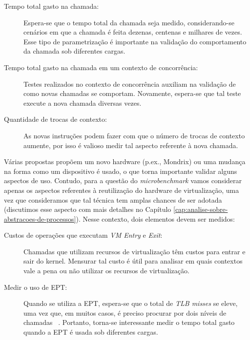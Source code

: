 \begin{description}
  \item [Tempo total gasto na chamada:]

Espera-se que o tempo total da chamada seja medido, considerando-se cenários em
que a chamada é feita dezenas, centenas e milhares de vezes. Esse tipo de
parametrização é importante na validação do comportamento da chamada sob
diferentes cargas.

  \item [Tempo total gasto na chamada em um contexto de concorrência:]

Testes realizados no contexto de concorrência auxiliam na validação de como
novas chamadas se comportam. Novamente, espera-se que tal teste execute
a nova chamada diversas vezes.

  \item [Quantidade de trocas de contexto:]

As novas instruções podem fazer com que o número de trocas de contexto aumente,
por isso é valioso medir tal aspecto referente à nova chamada.

\end{description}

Várias propostas propõem um novo hardware (p.ex., Mondrix) ou uma mudança na
forma como um dispositivo é usado, o que torna importante validar alguns
aspectos de uso. Contudo, para a questão do \emph{microbenchmark} vamos
considerar apenas os aspectos referentes à reutilização do hardware de
virtualização, uma vez que consideramos que tal técnica tem amplas chances de
ser adotada (discutimos esse aspecto com mais detalhes no Capítulo
\ref{cap:analise-sobre-abstracoes-de-processos}). Nesse contexto, dois
elementos devem ser medidos:

\begin{description}

  \item [Custos de operações que executam \emph{VM Entry} e \emph{Exit}:]

Chamadas que utilizam recursos de virtualização têm custos para entrar e sair
do kernel. Mensurar tal custo é útil para analisar em quais contextos vale a pena
ou não utilizar os recursos de virtualização.

  \item [Medir o uso de EPT:]

Quando se utiliza a EPT, espera-se que o total de \emph{TLB misses} se eleve,
uma vez que, em muitos casos, é preciso procurar por dois níveis de chamadas
~\citep{belay}. Portanto, torna-se interessante medir o tempo total gasto
quando a EPT é usada sob diferentes cargas.

\end{description}


